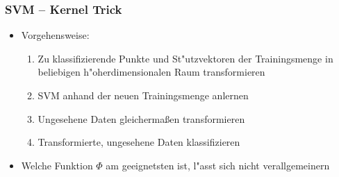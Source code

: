
\begin{frame}

\frametitle{SVM -- Kernel Trick}

\begin{itemize}
	\setlength{\itemsep}{10pt}
	\item Vorgehensweise:
	\vspace{10pt}
	\begin{enumerate}
		\setlength{\itemsep}{10pt}
		\item Zu klassifizierende Punkte und St"utzvektoren der Trainingsmenge in beliebigen h"oherdimensionalen Raum transformieren
		\item SVM anhand der neuen Trainingsmenge anlernen
		\item Ungesehene Daten gleicherma{\ss}en transformieren
		\item Transformierte, ungesehene Daten klassifizieren
	\end{enumerate}
	\item Welche Funktion $\Phi$ am geeignetsten ist, l"asst sich nicht verallgemeinern
\end{itemize}

\end{frame}






